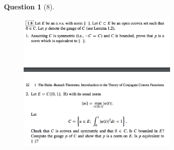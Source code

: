 \documentclass{article} %
\theoremstyle{quest}
\newtheorem*{question}{Question}
\begin{document}
\newpage

\begin{question}[8]
\hfill
\begin{figure}[h!]
  \centering
    \includegraphics[width=0.7\textwidth]{funcA-1-8.png}
\end{figure}
\end{question}
\end{document}
